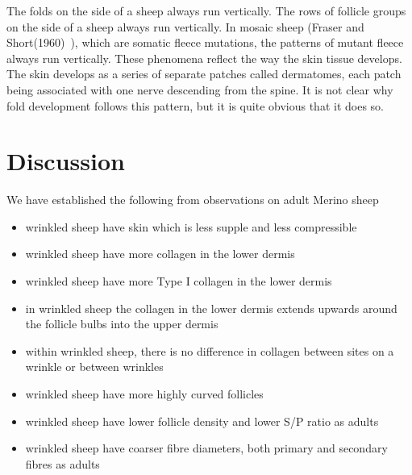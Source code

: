\documentclass[titlepage]{article}  %
\begin{document}
The folds on the side of a sheep always run vertically. The rows of follicle groups on the side of a sheep always run vertically. In mosaic sheep (Fraser and Short(1960)~\cite{fras:60}), which are somatic fleece mutations, the patterns of mutant fleece always run vertically.  These phenomena reflect the way the skin tissue develops. The skin develops as a series of separate patches called dermatomes, each patch being associated with one nerve descending from the spine. It is not clear why fold development follows this pattern, but it is quite obvious that it does so.

\clearpage
\section{Discussion}
We have established the following from observations on adult Merino sheep
\begin{itemize}
\item wrinkled sheep have skin which is less supple and less compressible
\item wrinkled sheep have more collagen in the lower dermis
\item wrinkled sheep have more Type I collagen in the lower dermis
\item in wrinkled sheep the collagen in the lower dermis extends upwards around the follicle bulbs into the upper dermis
\item within wrinkled sheep, there is no difference in collagen between sites on a wrinkle or between wrinkles 
\item wrinkled sheep have more highly curved follicles
\item wrinkled sheep have lower follicle density and lower S/P ratio as adults
\item wrinkled sheep have coarser fibre diameters, both primary and secondary fibres as adults
\end{itemize}
\end{document}
